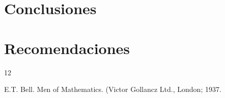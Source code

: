 \documentclass[12pt]{book}
\begin{document}
\section{Conclusiones}

\section{ Recomendaciones}





%
%


\begin{thebibliography}{12}

 E.T. Bell. Men of Mathematics. (Victor Gollancz Ltd., London; 1937.
\
\end{thebibliography}




\end{document}
